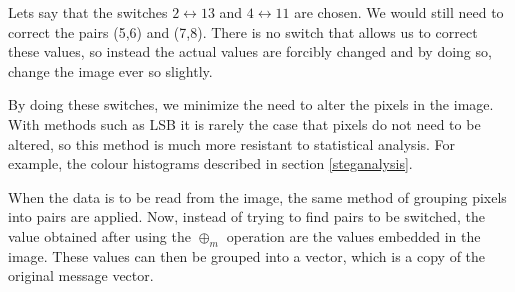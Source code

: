 Lets say that the switches $2\leftrightarrow 13$ and $4\leftrightarrow 11$ are chosen. We would still need to correct the pairs (5,6) and (7,8). There is no switch that allows us to correct these values, so instead the actual values are forcibly changed and by doing so, change the image ever so slightly.

By doing these switches, we minimize the need to alter the pixels in the image. With methods such as LSB it is rarely the case that pixels do not need to be altered, so this method is much more resistant to statistical analysis. For example, the colour histograms described in section \ref{steganalysis}.

When the data is to be read from the image, the same method of grouping pixels into pairs are applied. Now, instead of trying to find pairs to be switched, the value obtained after using the $\oplus_m$ operation are the values embedded in the image. These values can then be grouped into a vector, which is a copy of the original message vector.

